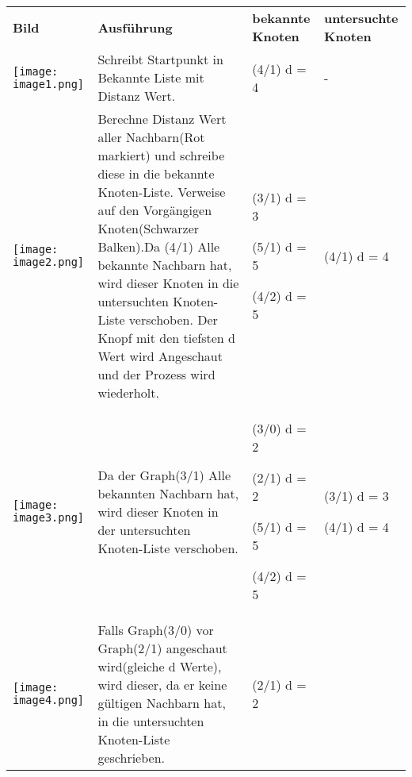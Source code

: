 \begin{longtable}[]{@{}llll@{}}
\endhead
\textbf{Bild} & \textbf{Ausführung} & \textbf{bekannte Knoten} &
\textbf{untersuchte Knoten}\tabularnewline
\texttt{[image: image1.png]} &
Schreibt Startpunkt in Bekannte Liste mit Distanz Wert. & (4/1) d = 4 &
-\tabularnewline
\begin{minipage}[t]{0.22\columnwidth}\raggedright
\texttt{[image: image2.png]}\strut
\end{minipage} & \begin{minipage}[t]{0.22\columnwidth}\raggedright
Berechne Distanz Wert aller Nachbarn(Rot markiert) und schreibe diese in
die bekannte Knoten-Liste. Verweise auf den Vorgängigen Knoten(Schwarzer
Balken).Da (4/1) Alle bekannte Nachbarn hat, wird dieser Knoten in die
untersuchten Knoten-Liste verschoben. Der Knopf mit den tiefsten d Wert
wird Angeschaut und der Prozess wird wiederholt.\strut
\end{minipage} & \begin{minipage}[t]{0.22\columnwidth}\raggedright
(3/1) d = 3

(5/1) d = 5

(4/2) d = 5\strut
\end{minipage} & \begin{minipage}[t]{0.22\columnwidth}\raggedright
(4/1) d = 4\strut
\end{minipage}\tabularnewline
\begin{minipage}[t]{0.22\columnwidth}\raggedright
\texttt{[image: image3.png]}\strut
\end{minipage} & \begin{minipage}[t]{0.22\columnwidth}\raggedright
Da der Graph(3/1) Alle bekannten Nachbarn hat, wird dieser Knoten in der
untersuchten Knoten-Liste verschoben.\strut
\end{minipage} & \begin{minipage}[t]{0.22\columnwidth}\raggedright
(3/0) d = 2

(2/1) d = 2

(5/1) d = 5

(4/2) d = 5\strut
\end{minipage} & \begin{minipage}[t]{0.22\columnwidth}\raggedright
(3/1) d = 3

(4/1) d = 4\strut
\end{minipage}\tabularnewline
\begin{minipage}[t]{0.22\columnwidth}\raggedright
\texttt{[image: image4.png]}\strut
\end{minipage} & \begin{minipage}[t]{0.22\columnwidth}\raggedright
Falls Graph(3/0) vor Graph(2/1) angeschaut wird(gleiche d Werte), wird
dieser, da er keine gültigen Nachbarn hat, in die untersuchten
Knoten-Liste geschrieben.\strut
\end{minipage} & \begin{minipage}[t]{0.22\columnwidth}\raggedright
(2/1) d = 2


\end{minipage}
\end{longtable}
